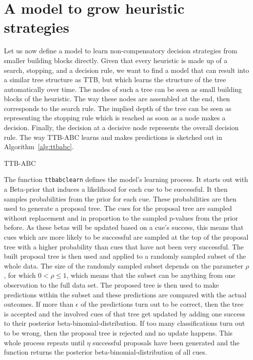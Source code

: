 \documentclass[a4paper,man, natbib]{apa6}
\begin{document}
\section{A model to grow heuristic strategies}
Let us now define a model to learn non-compensatory decision strategies from smaller building blocks directly. Given that every heuristic is made up of a search, stopping, and a decision rule, we want to find a model that can result into a similar tree structure as TTB, but which learns the structure of the tree automatically over time. The nodes of such a tree can be seen as small building blocks of the heuristic.  The way these nodes are assembled at the end, then corresponds to the search rule. The implied depth of the tree can be seen as representing the stopping rule which is reached as soon as a node makes a decision. Finally, the decision at a decisive node represents the overall decision rule. The way TTB-ABC learns and makes predictions is sketched out in Algorithm~\ref{alg:ttbabc}.\\

\FloatBarrier
\begin{algorithm}
\caption{TTB-ABC}
\label{alg:ttbabc}

\end{algorithm}
\FloatBarrier

The function \texttt{ttbabclearn} defines the model's learning process. It starts out with a Beta-prior that induces a likelihood for each cue to be successful. It then samples probabilities from the prior for each cue. These probabilities are then used to generate a proposal tree. The cues for the proposal tree are sampled without replacement and in proportion to the sampled p-values from the prior before. As these betas will be updated based on a cue's success, this means that cues which are more likely to be successful are sampled at the top of the proposal tree with a higher probability than cues that have not been very successful. The built proposal tree is then used and applied to a randomly sampled subset of the whole data. The size of the randomly sampled subset depends on the parameter $\rho$, for which $0<\rho\leq1$, which means that the subset can be anything from one observation to the full data set. The proposed tree is then used to make predictions within the subset and these predictions are compared with the actual outcomes. If more than $\epsilon$ of the predictions turn out to be correct, then the tree is accepted and the involved cues of that tree get updated by adding one success to their posterior beta-binomial-distribution. If too many classifications turn out to be wrong, then the proposal tree is rejected and no update happens. This whole process repeats until $\eta$ successful proposals have been generated and the function returns the posterior beta-binomial-distribution of all cues.
\end{document}
